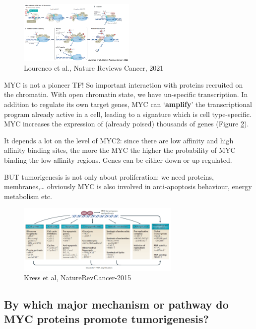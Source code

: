 \begin{figure}
\centering
\includegraphics[width=0.5\textwidth]{../_resources/10a2ad3114504053030a1071443aabd7.png}
\caption{Lourenco et al., Nature Reviews Cancer, 2021}
\label{fig:ppmyc}
\end{figure}

MYC is not a pioneer TF! So important interaction with proteins recruited on the chromatin.
With open chromatin state, we have un-specific transcription. In addition to regulate its own target genes, MYC can `\textbf{amplify}' the transcriptional program already active in a cell, leading to a signature which is cell type-specific. MYC increases the expression of (already poised) thousands of genes (Figure \ref{fig:ppmyc}).

It depends a lot on the level of MYC2: since there are low affinity and high affinity binding sites, the more the MYC the higher the probability of MYC binding the low-affinity regions. Genes can be either down or up regulated.

BUT tumorigenesis is not only about proliferation: we need proteins, membranes,\ldots{} obviously MYC is also involved in anti-apoptosis behaviour, energy metabolism etc.

\begin{figure}
\centering
\includegraphics[width=0.7\textwidth]{../_resources/cdb9692b7dd2ca7bcfae696cd1b1ce36.png}
\caption{Kress et al, NatureRevCancer-2015}
\label{fig:ppmyc}
\end{figure}


\hypertarget{by-which-major-mechanism-or-pathway-myc-proteins-promote-tumorigenesis}{%
\subsection{By which major mechanism or pathway do MYC proteins promote tumorigenesis?}\label{by-which-major-mechanism-or-pathway-myc-proteins-promote-tumorigenesis}}

